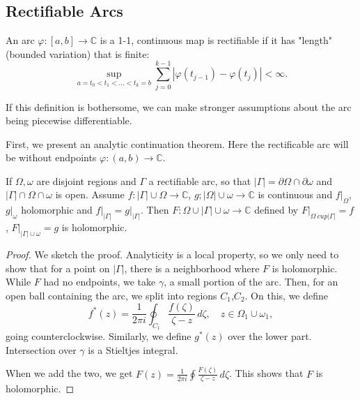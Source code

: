 \documentclass[12pt]{scrartcl}
\newcommand{\C}{\mathbb C}
\let \phi \varphi
\begin{document}
\subsection{Rectifiable Arcs}
\begin{definition}An arc $\phi:[a, b] \to \C$ is a 1-1, continuous map is rectifiable if it has "length"(bounded variation) that is finite:
$$\sup_{a = t_0 < t_1 < \dots < t_k = b} \sum_{j=0}^{k-1} |\phi(t_{j-1}) - \phi(t_j)| < \infty.$$
\end{definition}

If this definition is bothersome, we can make stronger assumptions about the arc being piecewise differentiable.

First, we present an analytic continuation theorem.  Here the rectificable arc will be without endpoints $\phi:(a, b) \to \C$.  

\begin{thm} If $\Omega, \omega$ are disjoint regions and $\Gamma$ a rectifiable arc, so that $|\Gamma| = \partial \Omega \cap \partial \omega$ and $|\Gamma| \cap \Omega \cap \omega$ is open.  Assume $f: |\Gamma| \cup \Omega \to \C$, $g; |\Omega| \cup \omega \to \C$ is continuous and $f\vert_{\Omega}$, $g \vert_\omega$ holomorphic and $f \vert_{|\Gamma|} = g \vert_{|\Gamma|}$.    Then $F: \Omega \cup |\Gamma| \cup \omega \to \C$ defined by $F\vert_{\Omega\ cup |\Gamma|} = f$, $F \vert_{|\Gamma|\cup \omega} = g$ is holomorphic.  
\end{thm}
\begin{proof}
We sketch the proof.  Analyticity is a local property, so we only need to show that for a point on $|\Gamma|$, there is a neighborhood where $F$ is holomorphic.  While $F$ had no endpoints,  we take $\gamma$, a small portion of the arc.  Then, for an open ball containing the arc, we split into regions $C_1$,$C_2$.  On this, we define 
$$f^*(z) = \frac{1}{2\pi i}\oint_{C_1} \frac{f(\zeta)}{\zeta - z}\,d\zeta, \quad z \in \Omega_1 \cup \omega_1,$$
 going counterclockwise.  Similarly, we define $g^*(z)$ over the lower part.  Intersection over $\gamma$ is a Stieltjes integral.
 
When we add the two, we get $F(z) = \frac{1}{2\pi i} \oint \frac{F(\zeta)}{\zeta - z}\,d\zeta$.  This shows that $F$ is holomorphic.  
\end{proof}
\end{document}
